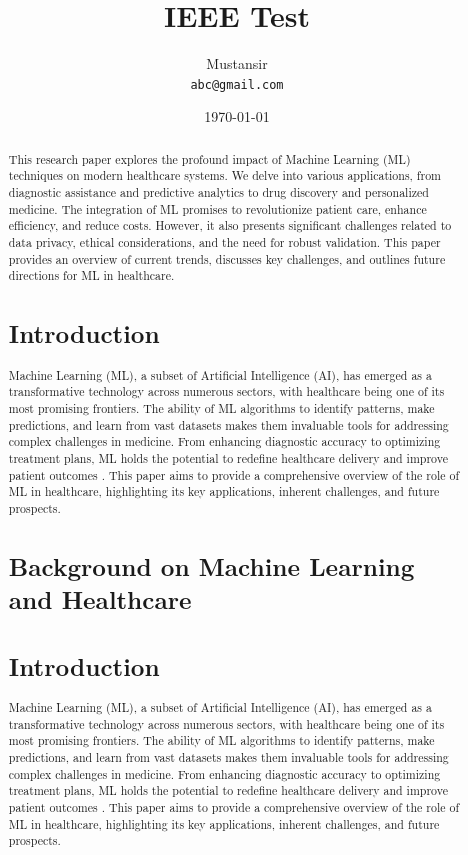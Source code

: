 \documentclass[11pt,a4paper]{article}
\title{IEEE Test}
\author{Mustansir \\ \texttt{abc@gmail.com}}
\date{\today}
\begin{document}
\maketitle

\begin{abstract}
This research paper explores the profound impact of Machine Learning (ML) techniques on modern healthcare systems. We delve into various applications, from diagnostic assistance and predictive analytics to drug discovery and personalized medicine. The integration of ML promises to revolutionize patient care, enhance efficiency, and reduce costs. However, it also presents significant challenges related to data privacy, ethical considerations, and the need for robust validation. This paper provides an overview of current trends, discusses key challenges, and outlines future directions for ML in healthcare.
\section{Introduction}
Machine Learning (ML), a subset of Artificial Intelligence (AI), has emerged as a transformative technology across numerous sectors, with healthcare being one of its most promising frontiers. The ability of ML algorithms to identify patterns, make predictions, and learn from vast datasets makes them invaluable tools for addressing complex challenges in medicine. From enhancing diagnostic accuracy to optimizing treatment plans, ML holds the potential to redefine healthcare delivery and improve patient outcomes \cite{Smith2020}. This paper aims to provide a comprehensive overview of the role of ML in healthcare, highlighting its key applications, inherent challenges, and future prospects.

\section{Background on Machine Learning and Healthcare}

\section{Introduction}
Machine Learning (ML), a subset of Artificial Intelligence (AI), has emerged as a transformative technology across numerous sectors, with healthcare being one of its most promising frontiers. The ability of ML algorithms to identify patterns, make predictions, and learn from vast datasets makes them invaluable tools for addressing complex challenges in medicine. From enhancing diagnostic accuracy to optimizing treatment plans, ML holds the potential to redefine healthcare delivery and improve patient outcomes \cite{Smith2020}. This paper aims to provide a comprehensive overview of the role of ML in healthcare, highlighting its key applications, inherent challenges, and future prospects.


\end{abstract}
\end{document}
